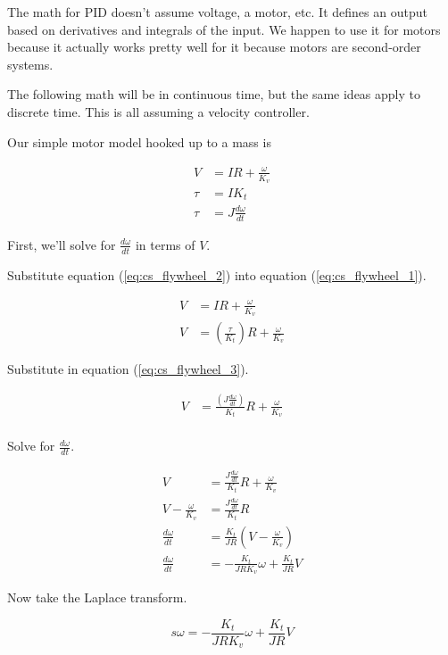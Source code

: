 The math for PID doesn't assume voltage, a motor, etc. It defines an output
based on derivatives and integrals of the input. We happen to use it for motors
because it actually works pretty well for it because motors are second-order
systems.

The following math will be in continuous time, but the same ideas apply to
discrete time. This is all assuming a velocity controller.

Our simple motor model hooked up to a mass is

\begin{align}
  V &= IR + \frac{\omega}{K_v} \label{eq:cs_flywheel_1} \\
  \tau &= I K_t \label{eq:cs_flywheel_2} \\
  \tau &= J \frac{d\omega}{dt} \label{eq:cs_flywheel_3}
\end{align}

First, we'll solve for $\frac{d\omega}{dt}$ in terms of $V$.

Substitute equation (\ref{eq:cs_flywheel_2}) into equation
 (\ref{eq:cs_flywheel_1}).

\begin{align*}
  V &= IR + \frac{\omega}{K_v} \\
  V &= \left(\frac{\tau}{K_t}\right) R + \frac{\omega}{K_v}
\end{align*}

Substitute in equation (\ref{eq:cs_flywheel_3}).

\begin{align*}
  V &= \frac{\left(J \frac{d\omega}{dt}\right)}{K_t} R + \frac{\omega}{K_v} \\
\end{align*}

Solve for $\frac{d\omega}{dt}$.

\begin{align*}
  V &= \frac{J \frac{d\omega}{dt}}{K_t} R + \frac{\omega}{K_v} \\
  V - \frac{\omega}{K_v} &= \frac{J \frac{d\omega}{dt}}{K_t} R \\
  \frac{d\omega}{dt} &= \frac{K_t}{JR} \left(V - \frac{\omega}{K_v}\right) \\
  \frac{d\omega}{dt} &= -\frac{K_t}{JRK_v} \omega + \frac{K_t}{JR} V
\end{align*}

Now take the Laplace transform.

\begin{equation}
  s \omega = -\frac{K_t}{JRK_v} \omega + \frac{K_t}{JR} V
  \label{eq:cs_motor_tf}
\end{equation}

